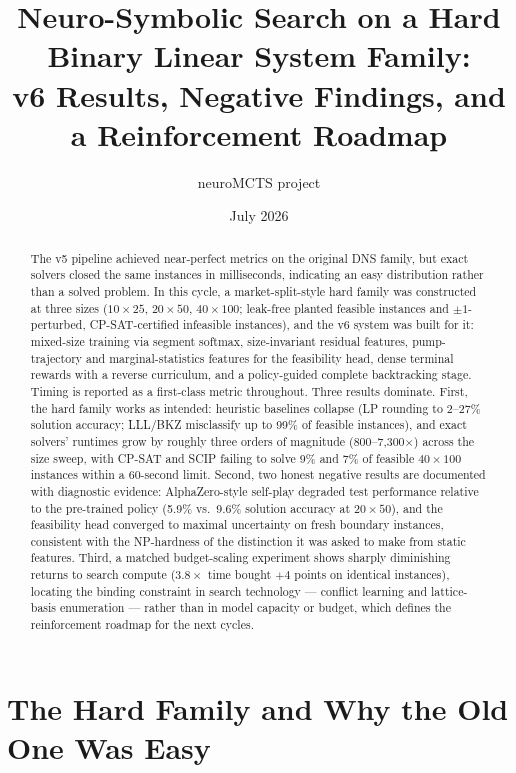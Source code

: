 \documentclass[12pt]{article}
\title{Neuro-Symbolic Search on a Hard Binary Linear System Family:\\
v6 Results, Negative Findings, and a Reinforcement Roadmap}
\author{neuroMCTS project}
\date{July 2026}
\begin{document}
\maketitle

\begin{abstract}
The v5 pipeline achieved near-perfect metrics on the original DNS family, but exact solvers closed the same instances in milliseconds, indicating an easy distribution rather than a solved problem. In this cycle, a market-split-style hard family was constructed at three sizes ($10 \times 25$, $20 \times 50$, $40 \times 100$; leak-free planted feasible instances and $\pm 1$-perturbed, CP-SAT-certified infeasible instances), and the v6 system was built for it: mixed-size training via segment softmax, size-invariant residual features, pump-trajectory and marginal-statistics features for the feasibility head, dense terminal rewards with a reverse curriculum, and a policy-guided complete backtracking stage. Timing is reported as a first-class metric throughout. Three results dominate. First, the hard family works as intended: heuristic baselines collapse (LP rounding to 2--27\% solution accuracy; LLL/BKZ misclassify up to 99\% of feasible instances), and exact solvers' runtimes grow by roughly three orders of magnitude (800--7{,}300$\times$) across the size sweep, with CP-SAT and SCIP failing to solve 9\% and 7\% of feasible $40 \times 100$ instances within a 60-second limit. Second, two honest negative results are documented with diagnostic evidence: AlphaZero-style self-play degraded test performance relative to the pre-trained policy (5.9\% vs.\ 9.6\% solution accuracy at $20 \times 50$), and the feasibility head converged to maximal uncertainty on fresh boundary instances, consistent with the NP-hardness of the distinction it was asked to make from static features. Third, a matched budget-scaling experiment shows sharply diminishing returns to search compute ($3.8\times$ time bought $+4$ points on identical instances), locating the binding constraint in search technology --- conflict learning and lattice-basis enumeration --- rather than in model capacity or budget, which defines the reinforcement roadmap for the next cycles.
\end{abstract}

\section{The Hard Family and Why the Old One Was Easy}
\end{document}
